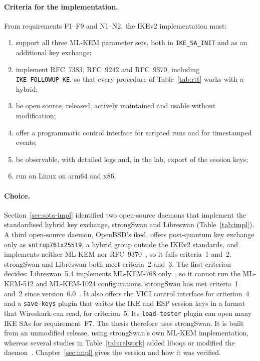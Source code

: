 \paragraph{Criteria for the implementation.}
From requirements F1--F9 and N1--N2, the IKEv2 implementation must:
\begin{enumerate}
    \item support all three ML-KEM parameter sets, both in
    \texttt{IKE\_SA\_INIT} and as an additional key exchange;
    \item implement RFC~7383, RFC~9242 and RFC~9370, including
    \texttt{IKE\_FOLLOWUP\_KE}, so that every procedure of
    Table~\ref{tab:rtt} works with a hybrid;
    \item be open source, released, actively maintained and usable without
    modification;
    \item offer a programmatic control interface for scripted runs and for
    timestamped events;
    \item be observable, with detailed logs and, in the lab, export of the
    session keys;
    \item run on Linux on arm64 and x86.
\end{enumerate}

\paragraph{Choice.}
Section~\ref{sec:sota-impl} identified two open-source daemons that implement
the standardised hybrid key exchange, strongSwan and Libreswan
(Table~\ref{tab:impl}). A third open-source daemon, OpenBSD's iked, offers
post-quantum key exchange only as \texttt{sntrup761\allowbreak x25519}, a hybrid group
outside the IKEv2 standards, and implements neither ML-KEM nor
RFC~9370~\cite{openbsdIked}, so it fails criteria~1 and~2. strongSwan and
Libreswan both meet criteria~2 and~3. The first criterion
decides: Libreswan~5.4 implements ML-KEM-768 only~\cite{libreswan}, so it
cannot run the ML-KEM-512 and ML-KEM-1024 configurations. strongSwan has met
criteria~1 and~2 since version~6.0~\cite{strongswan}. It also offers the VICI
control interface for criterion~4 and a \texttt{save-keys} plugin that writes
the IKE and ESP session keys in a format that Wireshark can read, for
criterion~5. Its \texttt{load-tester} plugin can open many IKE SAs for
requirement~F7. The thesis therefore uses strongSwan. It is built from an
unmodified release, using strongSwan's own ML-KEM implementation, whereas
several studies in Table~\ref{tab:relwork} added liboqs or modified the
daemon~\cite{bae2023,twardokus2025,he2025,rahul2026}.
Chapter~\ref{sec:impl} gives the version and how it was verified.

